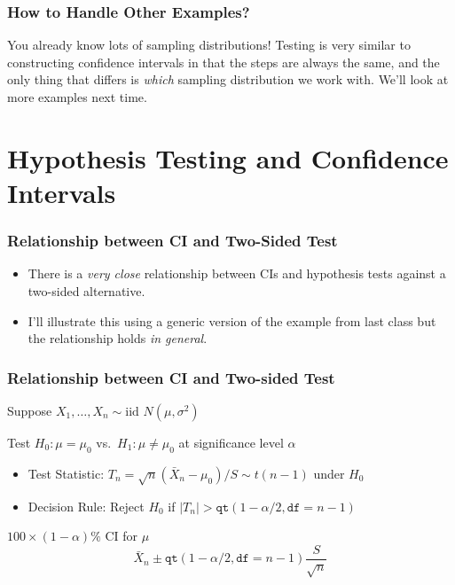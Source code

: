 \documentclass{beamer}
\begin{document}
\begin{frame}
\frametitle{How to Handle Other Examples?}

\alert{You already know lots of sampling distributions! Testing is very similar to constructing confidence intervals in that the steps are always the same, and the only thing that differs is \emph{which} sampling distribution we work with. We'll look at more examples next time.}

\end{frame}

\section{Hypothesis Testing and Confidence Intervals}
\begin{frame}
	\frametitle{Relationship between CI and Two-Sided Test}

	\begin{itemize}
		\item There is a \emph{very close} relationship between CIs and hypothesis tests against a two-sided alternative.
		\item I'll illustrate this using a generic version of the example from last class but the relationship holds \emph{in general}.
	\end{itemize}
\end{frame}
\begin{frame}
\frametitle{Relationship between CI and Two-sided Test}
Suppose $X_1, \hdots, X_n \sim \mbox{iid } N(\mu,\sigma^2)$

\vspace{1em}
	\begin{block}{Test $H_0\colon \mu = \mu_0$ vs.\ $H_1\colon \mu \neq \mu_0$ at significance level $\alpha$} 
		\begin{itemize}
			\item Test Statistic:  $T_n = \sqrt{n}(\bar{X}_n - \mu_0)/S \sim t(n-1)$ under $H_0$ 
			\item Decision Rule: Reject $H_0$ if $|T_n| > \texttt{qt}(1-\alpha/2, \texttt{df}=n-1)$ 
			\end{itemize}

			\pause
\end{block}
	\begin{block}{$100\times (1-\alpha)\%$ CI for $\mu$} 
		$$\bar{X}_n \pm \texttt{qt}(1-\alpha/2, \texttt{df}=n-1) \frac{S}{\sqrt{n}}$$
\end{block}
\end{frame}
\end{document}
